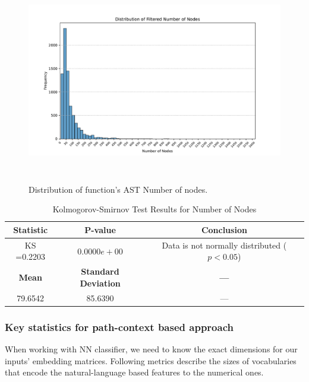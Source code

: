 \documentclass[10pt,english,a4paper]{report}
\begin{document}
\begin{figure}[H]
    \centering
    \includegraphics[width=16cm, height=9cm]{figures/num_nodes_merged.pdf}
    \caption{Distribution of function's AST Number of nodes.}
    \label{fig:ast_num_nodes_merged}
\end{figure}

\begin{table}[h!]
    \centering
    \caption{Kolmogorov-Smirnov Test Results for Number of Nodes}
    \label{tab:kolmogorov_smirnov_nodes}
    \begin{tabular}{|c|c|c|}
        \hline
        \textbf{Statistic} & \textbf{P-value} & \textbf{Conclusion} \\
        \hline
        KS =0.2203 & $0.0000e+00$ & Data is not normally distributed ($p < 0.05$) \\
        \hline
        \textbf{Mean} & \textbf{Standard Deviation} & \textbf{---} \\
        \hline
        79.6542 & 85.6390 & --- \\
        \hline
    \end{tabular}
\end{table}

\subsubsection{Key statistics for path-context based approach}
When working with NN classifier, we need to know the exact dimensions for our
inputs' embedding matrices. Following metrics describe the sizes of vocabularies
that encode the natural-language based features to the numerical ones.
\end{document}
